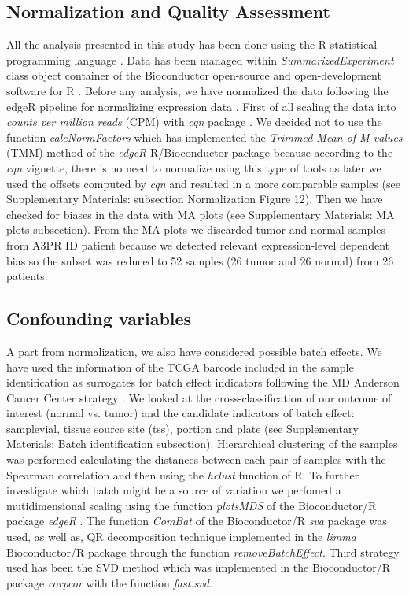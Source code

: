 \documentclass[9pt,twocolumn,twoside]{gsajnl}
\begin{document}
\subsection*{Normalization and Quality Assessment}
All the analysis presented in this study has been done using the R statistical programming language \citep{R}. Data has been managed within \textit{SummarizedExperiment} class object container \citep{SummarizedExperiment} of the Bioconductor open-source and open-development software for R \citep{Gentleman2004}. Before any analysis, we have normalized the data following the edgeR pipeline for normalizing expression data \citep{Robinson2010}. First of all scaling the data into \textit{counts per million reads} (CPM) with \textit{cqn} package \citep{Hansen2012}. We decided not to use the function \textit{calcNormFactors} which has implemented the \textit{Trimmed Mean of M-values} (TMM) method of the \textit{edgeR} R/Bioconductor package \citep{Robinson2010a} because according to the \textit{cqn} vignette, there is no need to normalize using this type of tools as later we used the offsets computed by \textit{cqn} \citep{Hansen2012} and resulted in a more comparable samples (see Supplementary Materials: subsection Normalization Figure 12). 
Then we have checked for biases in the data with MA plots (see Supplementary Materials: MA plots subsection). From the MA plots we discarded tumor and normal samples from  A3PR ID patient because we detected relevant expression-level dependent bias so the subset was reduced to 52 samples (26 tumor and 26 normal) from 26 patients.

\subsection*{Confounding variables}
A part from normalization, we also have considered possible batch effects. We have used the information of the TCGA barcode included in the sample identification as surrogates for batch effect indicators following the MD Anderson Cancer Center strategy \citep{batch}. We looked at the cross-classification of our outcome of interest (normal vs. tumor) and the candidate indicators of batch effect: samplevial, tissue source site (tss), portion and plate (see Supplementary Materials: Batch identification subsection). Hierarchical clustering of the samples was performed calculating the distances between each pair of samples with the Spearman correlation and then using the \textit{hclust} function of R. To further investigate which batch might be a source of variation we perfomed a mutidimensional scaling using the function \textit{plotsMDS} of the Bioconductor/R package \textit{edgeR} \citep{Robinson2010}. The function \textit{ComBat} of the Bioconductor/R \textit{sva} package \citep{sva} was used, as well as, QR decomposition technique implemented in the \textit{limma} Bioconductor/R package \citep{limma} through the function \textit{removeBatchEffect}. Third strategy used has been the SVD method \citep{Alter2000} which was implemented in the Bioconductor/R package \textit{corpcor} \citep{corpcor} with the function \textit{fast.svd}.
\end{document}
